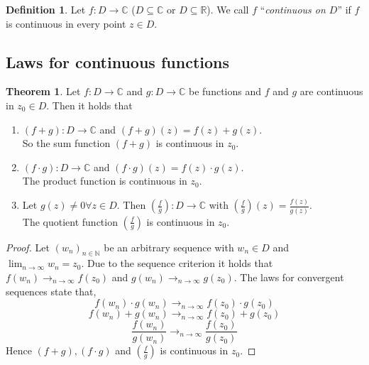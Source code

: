 \documentclass[a4paper,landscape,twocolumn]{article}
\theoremstyle{definition}
\newtheorem{theorem}{Theorem}
\newtheorem{defi}{Definition}
\newcommand\seq[1]{{\left(#1\right)}_{n \in \mathbb N}}
\begin{document}
\begin{defi}
  Let $f: D \rightarrow \mathbb C$ ($D \subseteq \mathbb C$ or $D \subseteq \mathbb R$).
  We call $f$ \enquote{\emph{continuous on $D$}} if $f$ is continuous in every point $z \in D$.
\end{defi}

\subsection{Laws for continuous functions}
%
\begin{theorem}
  Let $f: D \rightarrow \mathbb C$ and $g: D \rightarrow \mathbb C$ be functions
  and $f$ and $g$ are continuous in $z_0 \in D$. Then it holds that
  \begin{enumerate}
    \item $(f + g): D \to \mathbb C$ and $(f + g)(z) = f(z) + g(z)$. \\
      So the sum function $(f + g)$ is continuous in $z_0$.
    \item $(f \cdot g): D \rightarrow \mathbb C$ and $(f \cdot g)(z) = f(z) \cdot g(z)$. \\
      The product function is continuous in $z_0$.
    \item Let $g(z) \neq 0 \forall z \in D$. Then $\left(\frac{f}{g}\right): D \rightarrow \mathbb C$
      with $\left(\frac fg\right)(z) = \frac{f(z)}{g(z)}$. \\
      The quotient function $\left(\frac fg\right)$ is continuous in $z_0$.
  \end{enumerate}
\end{theorem}
\begin{proof}
  Let $\seq{w_n}$ be an arbitrary sequence with $w_n \in D$
  and $\lim_{n\to\infty} w_n = z_0$. Due to the sequence criterion
  it holds that $f(w_n) \to_{n\to\infty} f(z_0)$ and $g(w_n) \to_{n\to\infty} g(z_0)$.
  The laws for convergent sequences state that,
  \[ f(w_n) \cdot g(w_n) \to_{n\to\infty} f(z_0) \cdot g(z_0) \]
  \[ f(w_n) + g(w_n) \to_{n\to\infty} f(z_0) + g(z_0) \]
  \[ \frac{f(w_n)}{g(w_n)} \to_{n\to\infty} \frac{f(z_0)}{g(z_0)} \]
  Hence $(f + g), (f \cdot g)$ and $\left(\frac fg\right)$ is continuous in $z_0$.
\end{proof}
\end{document}
